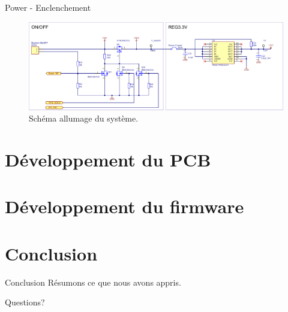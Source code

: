 \documentclass{beamer}
\begin{document}
\begin{frame}{Power - Enclenchement}
	\begin{figure}[h]
		\centering
		\includegraphics[width=.9\linewidth]{../figures/etude/sch/ON-OFF}
		\caption{Schéma allumage du système.}
		\label{fig:on-off}
	\end{figure}
\end{frame}

\section{Développement du PCB}

\section{Développement du firmware}


\section{Conclusion}
\begin{frame}{Conclusion}
	Résumons ce que nous avons appris.
\end{frame}

\begin{frame}[standout]
	Questions?
\end{frame}
	
\end{document}
